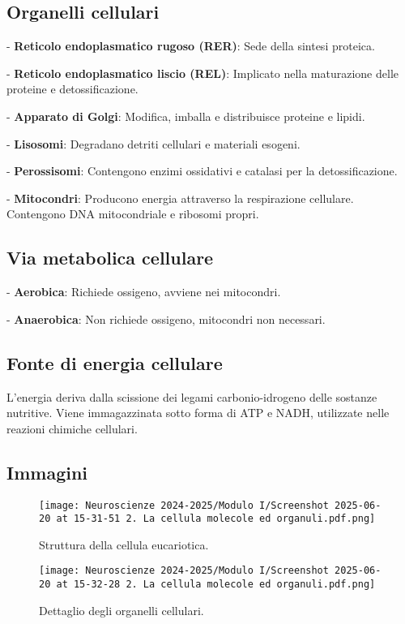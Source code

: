 \documentclass[a4paper,12pt]{article}
\begin{document}
\subsection*{Organelli cellulari}

    
- \textbf{Reticolo endoplasmatico rugoso (RER)}: Sede della sintesi proteica.
    
- \textbf{Reticolo endoplasmatico liscio (REL)}: Implicato nella maturazione delle proteine e detossificazione.
    
- \textbf{Apparato di Golgi}: Modifica, imballa e distribuisce proteine e lipidi.
    
- \textbf{Lisosomi}: Degradano detriti cellulari e materiali esogeni.
    
- \textbf{Perossisomi}: Contengono enzimi ossidativi e catalasi per la detossificazione.
    
- \textbf{Mitocondri}: Producono energia attraverso la respirazione cellulare. Contengono DNA mitocondriale e ribosomi propri.


\subsection*{Via metabolica cellulare}

    
- \textbf{Aerobica}: Richiede ossigeno, avviene nei mitocondri.
    
- \textbf{Anaerobica}: Non richiede ossigeno, mitocondri non necessari.


\subsection*{Fonte di energia cellulare}
L'energia deriva dalla scissione dei legami carbonio-idrogeno delle sostanze nutritive. Viene immagazzinata sotto forma di ATP e NADH, utilizzate nelle reazioni chimiche cellulari.

\subsection*{Immagini}
\begin{figure}[h!]
    \centering
    \texttt{[image: Neuroscienze 2024-2025/Modulo I/Screenshot 2025-06-20 at 15-31-51 2. La cellula molecole ed organuli.pdf.png]} %
    \caption{Struttura della cellula eucariotica.}
\end{figure}

\begin{figure}[h!]
    \centering
    \texttt{[image: Neuroscienze 2024-2025/Modulo I/Screenshot 2025-06-20 at 15-32-28 2. La cellula molecole ed organuli.pdf.png]} %
    \caption{Dettaglio degli organelli cellulari.}
\end{figure}
\end{document}
